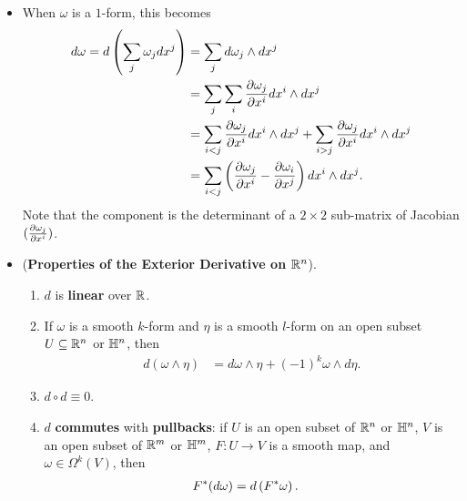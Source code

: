 \documentclass[11pt]{article}
\begin{document}
\begin{itemize}
\item \begin{remark}
When $\omega$ is a $1$-form, this becomes
\begin{align*}
d\omega = d\left(\sum_{j}\omega_j dx^j\right) &= \sum_j d\omega_j \wedge dx^{j}\\
&= \sum_j \sum_{i}\frac{\partial \omega_j}{ \partial x^i} dx^i \wedge dx^{j} \\
&= \sum_{i < j} \frac{\partial \omega_j}{ \partial x^i} dx^i \wedge dx^{j} + \sum_{i > j}\frac{\partial \omega_j}{ \partial x^i} dx^i \wedge dx^{j}\\
&= \sum_{i < j}\left(\frac{\partial \omega_j}{ \partial x^i}  - \frac{\partial \omega_i}{ \partial x^j}\right)dx^i \wedge dx^{j}.
\end{align*} Note that the component is the determinant of a $2 \times 2$ sub-matrix of Jacobian $(\frac{\partial \omega_j}{ \partial x^i})$.
\end{remark}

\item \begin{proposition} (\textbf{Properties of the Exterior Derivative on ${\mathbb R}^n$}).\\
\begin{enumerate}
\item $d$ is \textbf{linear} over ${\mathbb R}$.
\item If $\omega$ is a smooth $k$-form and $\eta$ is a smooth $l$-form on an open subset $U \subseteq {\mathbb R}^n$ or ${\mathbb H}^n$, then
\begin{align*}
d(\omega \wedge \eta) &= d\omega \wedge \eta + (-1)^{k}\omega \wedge d \eta.
\end{align*}
\item $d \circ d  \equiv 0$.
\item $d$ \textbf{commutes} with \textbf{pullbacks}: if $U$ is an open subset of ${\mathbb R}^n$ or ${\mathbb H}^n$, $V$ is an open subset of ${\mathbb R}^m$ or ${\mathbb H}^m$,  $F: U \rightarrow V$ is a smooth map, and $\omega \in \Omega^k(V)$, then
\begin{align}
F^{*}(d\omega) &= d\left(F^{*}\omega\right).  \label{eqn: exterior_derivatives_pullback_commute}
\end{align}
\end{enumerate}
\end{proposition}


\end{itemize}
\end{document}
